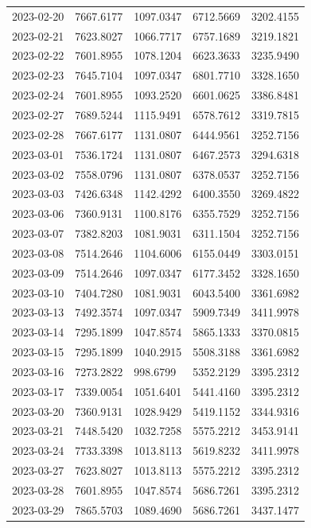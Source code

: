 \begin{footnotesize}
\begin{longtable}{lllll}
2023-02-20 & 7667.6177 & 1097.0347 & 6712.5669 & 3202.4155 \\
2023-02-21 & 7623.8027 & 1066.7717 & 6757.1689 & 3219.1821 \\
2023-02-22 & 7601.8955 & 1078.1204 & 6623.3633 & 3235.9490 \\
2023-02-23 & 7645.7104 & 1097.0347 & 6801.7710 & 3328.1650 \\
2023-02-24 & 7601.8955 & 1093.2520 & 6601.0625 & 3386.8481 \\
2023-02-27 & 7689.5244 & 1115.9491 & 6578.7612 & 3319.7815 \\
2023-02-28 & 7667.6177 & 1131.0807 & 6444.9561 & 3252.7156 \\
2023-03-01 & 7536.1724 & 1131.0807 & 6467.2573 & 3294.6318 \\
2023-03-02 & 7558.0796 & 1131.0807 & 6378.0537 & 3252.7156 \\
2023-03-03 & 7426.6348 & 1142.4292 & 6400.3550 & 3269.4822 \\
2023-03-06 & 7360.9131 & 1100.8176 & 6355.7529 & 3252.7156 \\
2023-03-07 & 7382.8203 & 1081.9031 & 6311.1504 & 3252.7156 \\
2023-03-08 & 7514.2646 & 1104.6006 & 6155.0449 & 3303.0151 \\
2023-03-09 & 7514.2646 & 1097.0347 & 6177.3452 & 3328.1650 \\
2023-03-10 & 7404.7280 & 1081.9031 & 6043.5400 & 3361.6982 \\
2023-03-13 & 7492.3574 & 1097.0347 & 5909.7349 & 3411.9978 \\
2023-03-14 & 7295.1899 & 1047.8574 & 5865.1333 & 3370.0815 \\
2023-03-15 & 7295.1899 & 1040.2915 & 5508.3188 & 3361.6982 \\
2023-03-16 & 7273.2822 & 998.6799 & 5352.2129 & 3395.2312 \\
2023-03-17 & 7339.0054 & 1051.6401 & 5441.4160 & 3395.2312 \\
2023-03-20 & 7360.9131 & 1028.9429 & 5419.1152 & 3344.9316 \\
2023-03-21 & 7448.5420 & 1032.7258 & 5575.2212 & 3453.9141 \\
2023-03-24 & 7733.3398 & 1013.8113 & 5619.8232 & 3411.9978 \\
2023-03-27 & 7623.8027 & 1013.8113 & 5575.2212 & 3395.2312 \\
2023-03-28 & 7601.8955 & 1047.8574 & 5686.7261 & 3395.2312 \\
2023-03-29 & 7865.5703 & 1089.4690 & 5686.7261 & 3437.1477 \\

\end{longtable}
\end{footnotesize}
